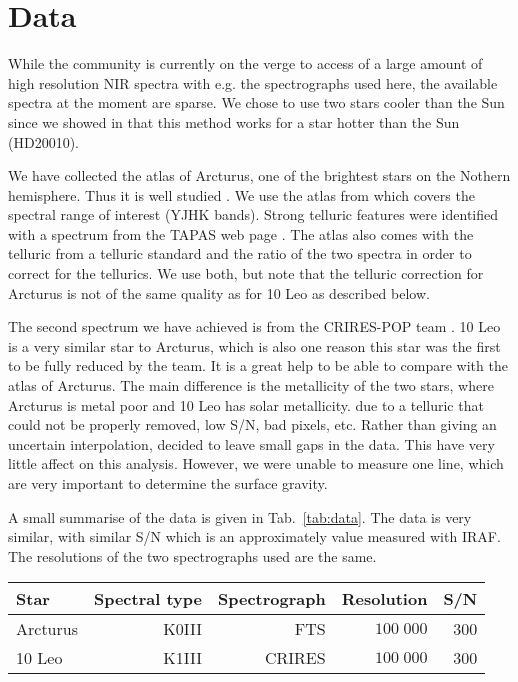 \documentclass{aa}
\begin{document}
\section{Data}
\label{sec:data}

While the community is currently on the verge to access of a large amount of
high resolution NIR spectra with e.g. the spectrographs used here, the available
spectra at the moment are sparse. We chose to use two stars cooler than the Sun
since we showed in \citet{Andreasen2016} that this method works for a star
hotter than the Sun (HD20010).

We have collected the atlas of Arcturus, one of the brightest stars on the
Nothern hemisphere. Thus it is well studied
\citep[see e.g.][to mention a few]{Griffin1967,McWilliam1990,Ramirez2013}. We
use the atlas from \cite{Hinkle2003} which covers the spectral range of interest
(YJHK bands). Strong telluric features were identified with a spectrum from the
TAPAS web page \citep{Bertaux2014}. The atlas also comes with the telluric from
a telluric standard and the ratio of the two spectra in order to correct for the
tellurics. We use both, but note that the telluric correction for Arcturus is
not of the same quality as for 10 Leo as described below.

The second spectrum we have achieved is from the CRIRES-POP team
\citep{Nicholls2016}. 10 Leo is a very similar star to Arcturus, which is also
one reason this star was the first to be fully reduced by the team. It is a
great help to be able to compare with the atlas of Arcturus. The main difference
is the metallicity of the two stars, where Arcturus is metal poor and 10 Leo has
solar metallicity. due to a telluric that could not be properly removed, low
S/N, bad pixels, etc. Rather than giving an uncertain interpolation,
\citet{Nicholls2016} decided to leave small gaps in the data. This have very
little affect on this analysis. However, we were unable to measure one
 line, which are very important to determine the surface gravity.

A small summarise of the data is given in Tab.~\ref{tab:data}. The data is very
similar, with similar S/N which is an approximately value measured with IRAF.
The resolutions of the two spectrographs used are the same.




\begin{table*}[htb!]
    \caption{The spectra and spectral type (from Simbad) of our sample with
             the corresponding spectrograph used to acquire the data and its
             spectra resolution. In the last column we show the S/N measured
             with splot in IRAF.}
    \label{tab:data}
    \centering
    \begin{tabular}{lrrrr}
      \hline\hline
        Star      & Spectral type & Spectrograph  & Resolution   &  S/N  \\
      \hline
        Arcturus  &      K0III    & FTS           &  $100\;000$  &  300  \\
        10 Leo    &      K1III    & CRIRES        &  $100\;000$  &  300
    \end{tabular}
\end{table*}
\end{document}
